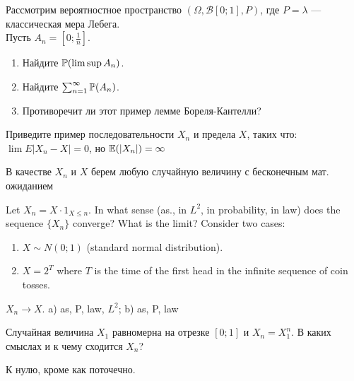 \begin{problem}
Рассмотрим вероятностное пространство
$(\Omega,\mathcal{B}[0;1],P)$, где $P=\lambda$ — классическая
мера Лебега.\\
Пусть $A_{n}=[0;\frac{1}{n}]$.
\begin{enumerate}
\item Найдите $\P(\limsup A_{n})$.
\item Найдите $\sum_{n=1}^{\infty}\P(A_{n})$.
\item Противоречит ли этот пример лемме Бореля-Кантелли?
\end{enumerate}

\begin{sol}

\end{sol}
\end{problem}

\begin{problem}
Приведите пример последовательности $X_{n}$ и предела $X$, таких что: $\lim E|X_{n}-X|=0$, но $\E(|X_{n}|)=\infty$

\begin{sol}
 В качестве $X_{n}$ и $ X $ берем любую случайную величину с бесконечным мат. ожиданием
\end{sol}
\end{problem}

\begin{problem}
Let $X_{n}=X\cdot 1_{X\leq n}$. In what sense (as., in $L^{2}$, in probability, in law) does the sequence $ \{X_{n}\} $ converge? What is the limit? Consider two cases:
\begin{enumerate}
\item $X\sim N(0;1)$ (standard normal distribution).
\item $X =2^{T}$ where $T$ is the time of the first head in the infinite sequence of coin tosses.
\end{enumerate}


\begin{sol}
 $ X_{n}\to X $. a) as, P, law, $ L^{2} $; b) as, P, law
\end{sol}
\end{problem}

\begin{problem}
Случайная величина $X_1$ равномерна на отрезке $[0;1]$ и $X_n=X_1^n$. В каких смыслах и к чему сходится $X_n$?

\begin{sol}
К нулю, кроме как поточечно.
\end{sol}
\end{problem}

